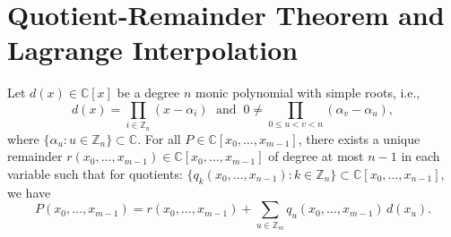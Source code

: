 \section{Quotient-Remainder Theorem and Lagrange Interpolation}\label{sec:QRT}
 \begin{proposition}\label{prop:multivariate-quotient-remainder}
Let $d(x)\in\mathbb{C}[x]$ be a degree $n$ monic polynomial with
simple roots, i.e.,
\begin{equation}
d(x)=\prod_{i\in\mathbb{Z}_{n}}(x-\alpha_{i})\;\text{ and }\:0\ne\prod_{0\le u<v<n}(\alpha_{v}-\alpha_{u}),
\end{equation}
where $\{\alpha_{u}:u\in\mathbb{Z}_{n}\}\subset\mathbb{C}$. 
For
all $P\in\mathbb{C}[x_{0},\ldots,x_{m-1}]$, there exists a unique remainder
$r(x_{0},\ldots,x_{m-1})\in\mathbb{C}[x_{0},\ldots,x_{m-1}]$ of degree
at most $n-1$ in each variable such that for quotients: $\big\{ q_{k}(x_{0},\ldots,x_{n-1}):k\in\mathbb{Z}_{n}\big\}\subset\mathbb{C}[x_{0},\ldots,x_{n-1}]$, we have
\begin{equation}
P(x_{0},\ldots,x_{m-1})= r(x_{0},\ldots,x_{m-1})+\sum_{u\in\mathbb{Z}_{m}}q_{u}(x_{0},\ldots,x_{m-1})\,d(x_{u}).
\end{equation}
 \end{proposition}
